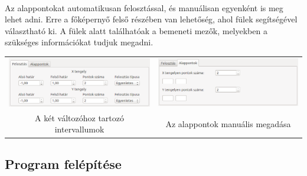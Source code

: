 \documentclass[12pt]{report}
\begin{document}
\paragraph{}
Az alappontokat automatikusan felosztással, és manuálisan egyenként is meg lehet adni. Erre a főképernyő felső részében van lehetőség, ahol fülek segítségével választható ki. A fülek alatt találhatóak a bemeneti mezők, melyekben a szükséges információkat tudjuk megadni. \\
\begin{tabular}{cc}
\includegraphics[width=7cm]{pics/gui/partition1} & \includegraphics[width=7cm]{pics/gui/partition2} \\
{\footnotesize A két változóhoz tartozó intervallumok} & {\footnotesize Az alappontok manuális megadása} 
\end{tabular}
\subsection{Program felépítése}
\end{document}
